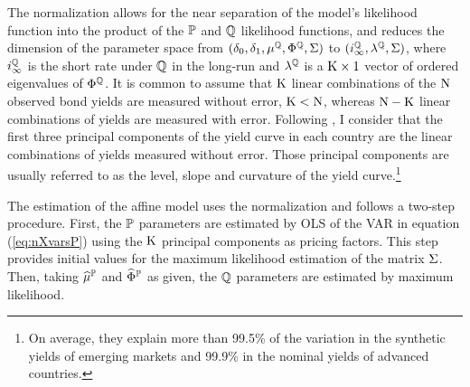 {The \cite{JSZ:2011} normalization allows for the near separation of the model's likelihood function into the product of the \(\mathbb{P}\) and \(\mathbb{Q}\) likelihood functions, and reduces the dimension of the parameter space from \((\delta_{0}, \delta_{1}, \mu^{\mathbb{Q}}, \Phi^{\mathbb{Q}}, \Sigma)\) to \((i^{\mathbb{Q}}_{\infty}, \lambda^{\mathbb{Q}},\Sigma)\), where \(i^{\mathbb{Q}}_{\infty}\) is the short rate under \(\mathbb{Q}\) in the long-run and \(\lambda^{\mathbb{Q}}\) is a \(\mathrm{K} \times 1\) vector of ordered eigenvalues of \(\Phi^{\mathbb{Q}}\).
It is common to assume that \(\mathrm{K}\) linear combinations of the \(\mathrm{N}\) observed bond yields are measured without error, \(\mathrm{K} < \mathrm{N}\), whereas \(\mathrm{N} - \mathrm{K}\) linear combinations of yields are measured with error. 
Following \cite{JSZ:2011}, I consider that the first three principal components of the yield curve in each country are the linear combinations of yields measured without error.
Those principal components are usually  
referred to as the level, slope and curvature of the yield curve.\footnote{ On average, they explain more than 99.5\% of the variation in the synthetic yields of emerging markets and 99.9\% in the nominal yields of advanced countries.}
%	
%	

The estimation of the affine model uses the \cite{JSZ:2011} normalization and follows a two-step procedure. 
First, the \(\mathbb{P}\) parameters are estimated by OLS of the VAR in equation (\ref{eq:nXvarsP}) using the \(\mathrm{K}\) principal components as pricing factors. 
This step provides initial values for the maximum likelihood estimation of the matrix \(\Sigma\). Then, taking \(\widehat{\mu}^{\mathbb{P}}\) and \(\widehat{\Phi}^{\mathbb{P}}\) as given, the \(\mathbb{Q}\) parameters are estimated by maximum likelihood. 

}
